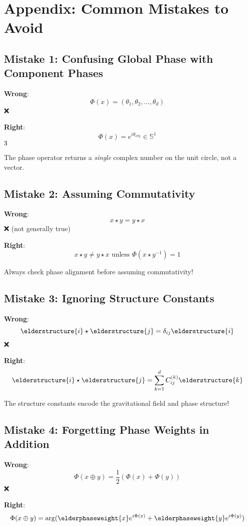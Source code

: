 \documentclass[12pt,a4paper]{article}
\newcommand{\checkmark}{\ding{51}}
\theoremstyle{definition}
\theoremstyle{remark}
\begin{document}
\newpage
\section{Appendix: Common Mistakes to Avoid}

\subsection{Mistake 1: Confusing Global Phase with Component Phases}

\textbf{Wrong}:
$$\Phi(x) = (\theta_1, \theta_2, ..., \theta_d)$$ ❌

\textbf{Right}:
$$\Phi(x) = e^{i\theta_{\text{avg}}} \in \mathbb{S}^1$$ $\checkmark$

The phase operator returns a \textit{single} complex number on the unit circle, not a vector.

\subsection{Mistake 2: Assuming Commutativity}

\textbf{Wrong}:
$$x \star y = y \star x$$ ❌ (not generally true)

\textbf{Right}:
$$x \star y \neq y \star x \text{ unless } \Phi(x \star y^{-1}) = 1$$

Always check phase alignment before assuming commutativity!

\subsection{Mistake 3: Ignoring Structure Constants}

\textbf{Wrong}:
$$\elderstructure{i} \star \elderstructure{j} = \delta_{ij} \elderstructure{i}$$ ❌

\textbf{Right}:
$$\elderstructure{i} \star \elderstructure{j} = \sum_{k=1}^{d} C_{ij}^{(k)} \elderstructure{k}$$

The structure constants encode the gravitational field and phase structure!

\subsection{Mistake 4: Forgetting Phase Weights in Addition}

\textbf{Wrong}:
$$\Phi(x \oplus y) = \frac{1}{2}(\Phi(x) + \Phi(y))$$ ❌

\textbf{Right}:
$$\Phi(x \oplus y) = \arg(\elderphaseweight{x}e^{i\Phi(x)} + \elderphaseweight{y}e^{i\Phi(y)})$$
\end{document}
